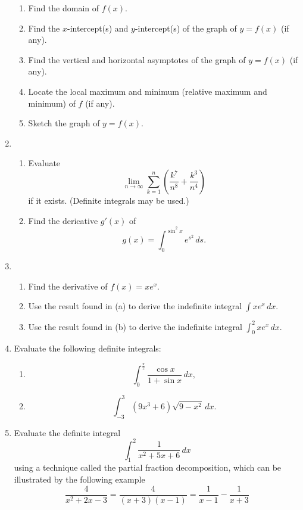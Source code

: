 \documentclass{report}
\begin{document}
\begin{enumerate}
\begin{enumerate}
        \item Find the domain of $f(x)$.
        \item Find the $x$-intercept(s) and $y$-intercept(s) of the graph of $y = f(x)$ (if any).
        \item Find the vertical and horizontal asymptotes of the graph of $y=f(x)$ (if any).
        \item Locate the local maximum and minimum (relative maximum and minimum) of $f$ (if any).
        \item Sketch the graph of $y=f(x)$.
    \end{enumerate}
    \item \begin{enumerate}
        \item Evaluate \[\lim_{n \to \infty}  \sum_{k=1}^{n}  \left(\frac{k^{7}}{n^{8}}+\frac{k^{3}}{n^{4}}\right)\] if it exists. (Definite integrals may be used.)
        \item Find the dericative $g'(x)$ of \[g(x)=\int_{0}^{\sin ^{2}x} e^{s^{2}}  \,ds. \]
    \end{enumerate}
    \item \begin{enumerate}
        \item Find the derivative of $f(x) = x e^{x}$.
        \item Use the result found in (a) to derive the indefinite integral $\int xe^{x}\,dx.$
        \item Use the result found in (b) to derive the indefinite integral $\int_{0}^{2} xe^{x}\,dx.$
    \end{enumerate}
    \item Evaluate the following definite integrals:
    \begin{enumerate}
        \item \[\int_{0}^{\frac{\pi}{2}}\frac{\cos x}{1+\sin x}  \,dx,\]
        \item \[\int_{-3}^{3} (9x^{3}+6)\sqrt{9-x^{2}}  \,dx.\]
    \end{enumerate}
    \item Evaluate the definite integral \[\int_{1}^{2}\frac{1}{x^{2}+5x+6}\,dx\] using a technique called the partial fraction decomposition, which can be illustrated by the following example \[\frac{4}{x^{2}+2x-3} =\frac{4}{(x+3)(x-1)}= \frac{1}{x-1} - \frac{1}{x+3}\]
\end{enumerate}
\end{document}
